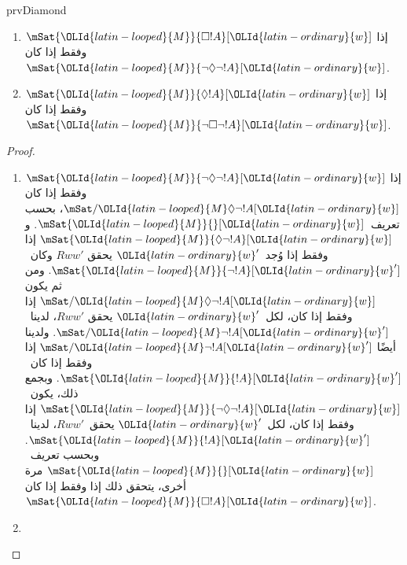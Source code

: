 \documentclass[../../../include/open-logic-section]{subfiles}
\begin{document}
\begin{tagblock}{prvDiamond}
\begin{prop}
  \begin{enumerate}
  \item $\mSat{\OLId{latin-looped}{M}}{\Box !A}[\OLId{latin-ordinary}{w}]$ إذا وفقط إذا كان
    $\mSat{\OLId{latin-looped}{M}}{\lnot\Diamond\lnot !A}[\OLId{latin-ordinary}{w}]$.
  \item $\mSat{\OLId{latin-looped}{M}}{\Diamond !A}[\OLId{latin-ordinary}{w}]$ إذا وفقط إذا كان
    $\mSat{\OLId{latin-looped}{M}}{\lnot\Box\lnot !A}[\OLId{latin-ordinary}{w}]$.
  \end{enumerate}
\end{prop}

\begin{proof}
  \begin{enumerate}
    \item $\mSat{\OLId{latin-looped}{M}}{\lnot\Diamond\lnot !A}[\OLId{latin-ordinary}{w}]$ إذا وفقط إذا كان
      $\mSat/{\OLId{latin-looped}{M}}{\Diamond\lnot !A}[\OLId{latin-ordinary}{w}]$، بحسب تعريف~$\mSat{\OLId{latin-looped}{M}}{}[\OLId{latin-ordinary}{w}]$.
      و$\mSat{\OLId{latin-looped}{M}}{\Diamond\lnot !A}[\OLId{latin-ordinary}{w}]$ إذا وفقط إذا وُجد~$\OLId{latin-ordinary}{w}'$ يحقق
      $Rww'$ وكان~$\mSat{\OLId{latin-looped}{M}}{\lnot !A}[\OLId{latin-ordinary}{w}']$. ومن ثم يكون
      $\mSat/{\OLId{latin-looped}{M}}{\Diamond\lnot !A}[\OLId{latin-ordinary}{w}]$ إذا وفقط إذا كان، لكل~$\OLId{latin-ordinary}{w}'$ يحقق
      $Rww'$، لدينا~$\mSat/{\OLId{latin-looped}{M}}{\lnot !A}[\OLId{latin-ordinary}{w}']$. ولدينا أيضًا
      $\mSat/{\OLId{latin-looped}{M}}{\lnot !A}[\OLId{latin-ordinary}{w}']$ إذا وفقط إذا كان~$\mSat{\OLId{latin-looped}{M}}{!A}[\OLId{latin-ordinary}{w}']$.
      وبجمع ذلك، يكون~$\mSat{\OLId{latin-looped}{M}}{\lnot\Diamond\lnot !A}[\OLId{latin-ordinary}{w}]$ إذا وفقط
      إذا كان، لكل~$\OLId{latin-ordinary}{w}'$ يحقق~$Rww'$، لدينا~$\mSat{\OLId{latin-looped}{M}}{!A}[\OLId{latin-ordinary}{w}']$. وبحسب
      تعريف~$\mSat{\OLId{latin-looped}{M}}{}[\OLId{latin-ordinary}{w}]$ مرة أخرى، يتحقق ذلك إذا وفقط إذا كان
      $\mSat{\OLId{latin-looped}{M}}{\Box !A}[\OLId{latin-ordinary}{w}]$.
    \item {}
\end{enumerate}
\end{proof}
\end{tagblock}
\end{document}

